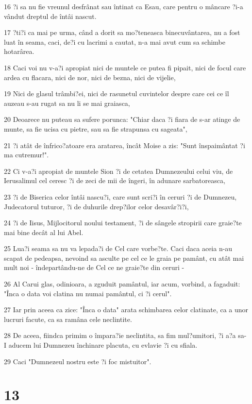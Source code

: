 \par 16 ?i sa nu fie vreunul desfrânat sau întinat ca Esau, care pentru o mâncare ?i-a vândut dreptul de întâi nascut.
\par 17 ?ti?i ca mai pe urma, când a dorit sa mo?teneasca binecuvântarea, nu a fost luat în seama, caci, de?i cu lacrimi a cautat, n-a mai avut cum sa schimbe hotarârea.
\par 18 Caci voi nu v-a?i apropiat nici de muntele ce putea fi pipait, nici de focul care ardea cu flacara, nici de nor, nici de bezna, nici de vijelie,
\par 19 Nici de glasul trâmbi?ei, nici de rasunetul cuvintelor despre care cei ce îl auzeau s-au rugat sa nu li se mai graiasca,
\par 20 Deoarece nu puteau sa sufere porunca: "Chiar daca ?i fiara de s-ar atinge de munte, sa fie ucisa cu pietre, sau sa fie strapunsa cu sageata",
\par 21 ?i atât de înfrico?atoare era aratarea, încât Moise a zis: "Sunt înspaimântat ?i ma cutremur!".
\par 22 Ci v-a?i apropiat de muntele Sion ?i de cetatea Dumnezeului celui viu, de Ierusalimul cel ceresc ?i de zeci de mii de îngeri, în adunare sarbatoreasca,
\par 23 ?i de Biserica celor întâi nascu?i, care sunt scri?i în ceruri ?i de Dumnezeu, Judecatorul tuturor, ?i de duhurile drep?ilor celor desavâr?i?i,
\par 24 ?i de Iisus, Mijlocitorul noului testament, ?i de sângele stropirii care graie?te mai bine decât al lui Abel.
\par 25 Lua?i seama sa nu va lepada?i de Cel care vorbe?te. Caci daca aceia n-au scapat de pedeapsa, nevoind sa asculte pe cel ce le graia pe pamânt, cu atât mai mult noi - îndepartându-ne de Cel ce ne graie?te din ceruri -
\par 26 Al Carui glas, odinioara, a zguduit pamântul, iar acum, vorbind, a fagaduit: "Înca o data voi clatina nu numai pamântul, ci ?i cerul".
\par 27 Iar prin aceea ca zice: "Înca o data" arata schimbarea celor clatinate, ca a unor lucruri facute, ca sa ramâna cele neclintite.
\par 28 De aceea, fiindca primim o împara?ie neclintita, sa fim mul?umitori, ?i a?a sa-I aducem lui Dumnezeu închinare placuta, cu evlavie ?i cu sfiala.
\par 29 Caci "Dumnezeul nostru este ?i foc mistuitor".

\chapter{13}

